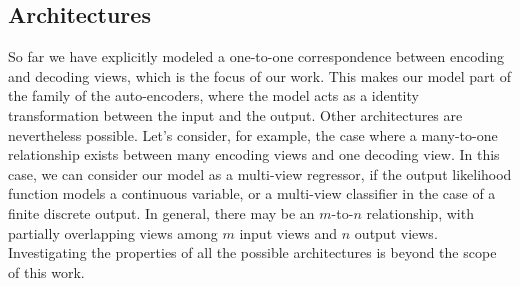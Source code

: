 \subsection{Architectures}
So far we have explicitly modeled a one-to-one correspondence between encoding and decoding views, which is the focus of our work.
This makes our model part of the family of the auto-encoders, where the model acts as a identity transformation between the input and the output.
Other architectures are nevertheless possible.
Let's consider, for example, the case where a many-to-one relationship exists between many encoding views and one decoding view.
In this case, we can consider our model as a multi-view regressor, if the output likelihood function models a continuous variable, or a multi-view classifier in the case of a finite discrete output.
In general, there may be an $m$-to-$n$ relationship, with partially overlapping views among $m$ input views and $n$ output views.
Investigating the properties of all the possible architectures is beyond the scope of this work.

